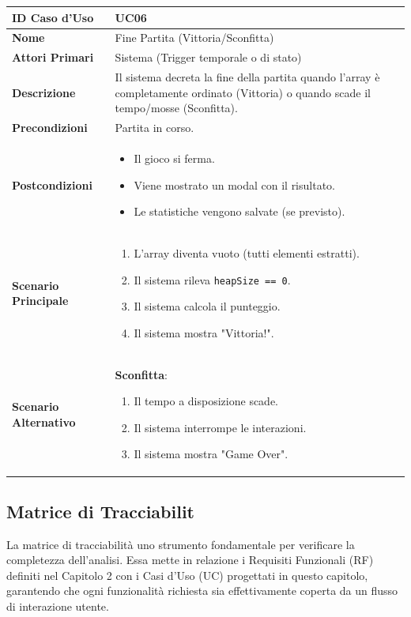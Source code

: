 \documentclass[openany]{theme/uniprthesis}
\begin{document}
\begin{xltabular}{\textwidth}{|l|X|}
\hline
\textbf{ID Caso d'Uso} & UC06 \\
\hline
\textbf{Nome} & Fine Partita (Vittoria/Sconfitta) \\
\hline
\textbf{Attori Primari} & Sistema (Trigger temporale o di stato) \\
\hline
\textbf{Descrizione} & Il sistema decreta la fine della partita quando l'array è completamente ordinato (Vittoria) o quando scade il tempo/mosse (Sconfitta). \\
\hline
\textbf{Precondizioni} & Partita in corso. \\
\hline
\textbf{Postcondizioni} & \begin{itemize}
    \item Il gioco si ferma.
    \item Viene mostrato un modal con il risultato.
    \item Le statistiche vengono salvate (se previsto).
\end{itemize} \\
\hline
\textbf{Scenario Principale} & \begin{enumerate}
    \item L'array diventa vuoto (tutti elementi estratti).
    \item Il sistema rileva \texttt{heapSize == 0}.
    \item Il sistema calcola il punteggio.
    \item Il sistema mostra "Vittoria!".
\end{enumerate} \\
\hline
\textbf{Scenario Alternativo} & \textbf{Sconfitta}:
\begin{enumerate}
    \item Il tempo a disposizione scade.
    \item Il sistema interrompe le interazioni.
    \item Il sistema mostra "Game Over".
\end{enumerate} \\
\hline
\end{xltabular}


\subsection{Matrice di Tracciabilit }
La matrice di tracciabilità  uno strumento fondamentale per verificare la completezza dell'analisi. Essa mette in relazione i Requisiti Funzionali (RF) definiti nel Capitolo 2 con i Casi d'Uso (UC) progettati in questo capitolo, garantendo che ogni funzionalità richiesta sia effettivamente coperta da un flusso di interazione utente.
\end{document}
